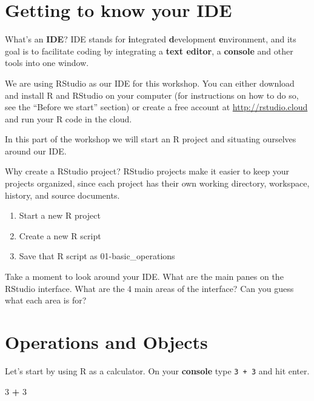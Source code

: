 \documentclass[]{book}
\newenvironment{Shaded}{\begin{snugshade}}{\end{snugshade}}
\newcommand{\DecValTok}[1]{\textcolor[rgb]{0.00,0.00,0.81}{#1}}
\newcommand{\OperatorTok}[1]{\textcolor[rgb]{0.81,0.36,0.00}{\textbf{#1}}}
\newcommand{\StringTok}[1]{\textcolor[rgb]{0.31,0.60,0.02}{#1}}
\providecommand{\tightlist}{%
  \setlength{\itemsep}{0pt}\setlength{\parskip}{0pt}}
\begin{document}
\hypertarget{getting-to-know-your-ide}{%
\section{Getting to know your IDE}\label{getting-to-know-your-ide}}

\leavevmode\hypertarget{explanation}{}%
What's an \textbf{IDE}? IDE stands for \textbf{i}ntegrated \textbf{d}evelopment \textbf{e}nvironment, and its goal is to facilitate coding by integrating a \textbf{text editor}, a \textbf{console} and other tools into one window.

We are using RStudio as our IDE for this workshop. You can either download and install R and RStudio on your computer (for instructions on how to do so, see the ``Before we start'' section) or create a free account at \url{http://rstudio.cloud} and run your R code in the cloud.

In this part of the workshop we will start an R project and situating ourselves around our IDE.

\leavevmode\hypertarget{explanation}{}%
Why create a RStudio project? RStudio projects make it easier to keep your projects organized, since each project has their own working directory, workspace, history, and source documents.

\begin{enumerate}
\def\labelenumi{\arabic{enumi}.}
\tightlist
\item
  Start a new R project
\item
  Create a new R script
\item
  Save that R script as 01-basic\_operations
\end{enumerate}

\leavevmode\hypertarget{question}{}%
Take a moment to look around your IDE. What are the main panes on the RStudio interface. What are the 4 main areas of the interface? Can you guess what each area is for?

\hypertarget{operations-and-objects}{%
\section{Operations and Objects}\label{operations-and-objects}}

Let's start by using R as a calculator. On your \textbf{console} type \texttt{3\ +\ 3} and hit enter.

\begin{Shaded}
\begin{Highlighting}[]
\DecValTok{3} \OperatorTok{+}\StringTok{ }\DecValTok{3}
\end{Highlighting}
\end{Shaded}
\end{document}
